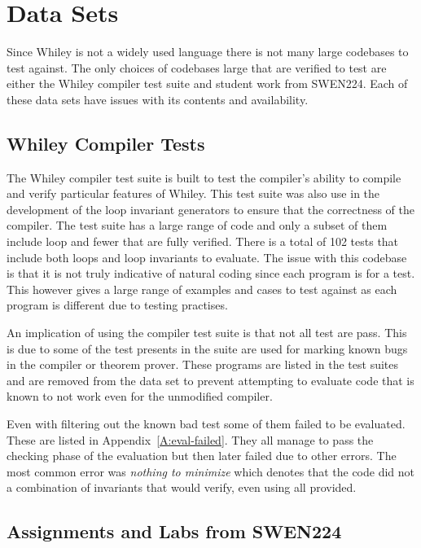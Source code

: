 \section{Data Sets}

Since Whiley is not a widely used language there is not many large codebases
to test against.
The only choices of codebases large that are verified to test are either the
Whiley compiler test suite and student work from SWEN224.
Each of these data sets have issues with its contents and availability.

\subsection{Whiley Compiler Tests}

The Whiley compiler test suite is built to test the compiler's ability to
compile and verify particular features of Whiley.
This test suite was also use in the development of the loop invariant
generators to ensure that the correctness of the compiler.
The test suite has a large range of code and only a subset of them include
loop and fewer that are fully verified.
There is a total of 102 tests that include both loops and loop invariants to
evaluate.
The issue with this codebase is that it is not truly indicative of
natural coding since each program is for a test.
This however gives a large range of examples and cases to test against
as each program is different due to testing practises.

An implication of using the compiler test suite is that not all test
are pass.
This is due to some of the test presents in the suite are used for marking
known bugs in the compiler or theorem prover.
These programs are listed in the test suites and are removed from
the data set to prevent attempting to evaluate code that is known to
not work even for the unmodified compiler.

Even with filtering out the known bad test some of them failed to be evaluated.
These are listed in Appendix~\ref{A:eval-failed}.
They all manage to pass the checking phase of the evaluation but then later
failed due to other errors. The most common error was \textit{nothing to minimize}
which denotes that the code did not a combination of invariants that would verify, 
even using all provided.

\subsection{Assignments and Labs from SWEN224}

